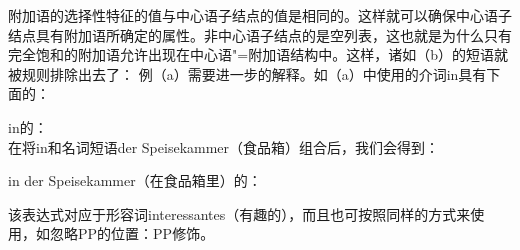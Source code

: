 附加语的选择性特征的值与中心语子结点的\synsemc 值是相同的。这样就可以确保中心语子结点具有附加语所确定的属性。非中心语子结点的\subcatvc 是空列表，这也就是为什么只有完全饱和的附加语允许出现在中心语"=附加语结构中。这样，诸如（b）的短语就被规则排除出去了：
\eal
{}
\zl
例（a）需要进一步的解释。如（a）中使用的介词in具有下面的\catvc：

\ea
in的\catvc：\\
\z
在将in和名词短语der Speisekammer（食品箱）组合后，我们会得到：

\eas
in der Speisekammer（在食品箱里）的\catvc：\\
\zs

\noindent
该表达式对应于形容词interessantes（有趣的），而且也可按照同样的方式来使用，如忽略PP的位置：PP修饰\nbarc。

